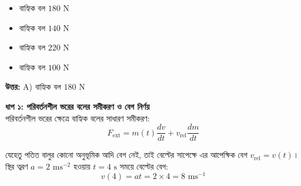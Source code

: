\documentclass[12pt, a4paper]{article}
\begin{document}
{{%
\vspace{1em}
\begin{center}
\end{center}
\vspace{1em}

\begin{itemize}[label={}, leftmargin=1cm, itemsep=0.5em]
    \item[\textbf{A)}] বাহ্যিক বল $180\text{ N}$
    \item[\textbf{B)}] বাহ্যিক বল $140\text{ N}$
    \item[\textbf{C)}] বাহ্যিক বল $220\text{ N}$
    \item[\textbf{D)}] বাহ্যিক বল $100\text{ N}$
\end{itemize}

\vspace{0.5em}
\begin{tcolorbox}[answerbox]
    \textbf{\color{success} উত্তর:} A) বাহ্যিক বল $180\text{ N}$
\end{tcolorbox}
\vspace{1em}

\begin{tcolorbox}[solutionbox={সমাধান (Solution)}]
    \noindent
    \textbf{ধাপ ১: পরিবর্তনশীল ভরের বলের সমীকরণ ও বেগ নির্ণয়} \\
    পরিবর্তনশীল ভরের ক্ষেত্রে বাহ্যিক বলের সাধারণ সমীকরণ:
    \[ F_{\text{ext}} = m(t) \frac{dv}{dt} + v_{\text{rel}} \frac{dm}{dt} \]
    
    যেহেতু পতিত বালুর কোনো অনুভূমিক আদি বেগ নেই, তাই বেল্টের সাপেক্ষে এর আপেক্ষিক বেগ $v_{\text{rel}} = v(t)$। স্থির ত্বরণ $a = 2\text{ ms}^{-2}$ হওয়ায় $t = 4\text{ s}$ সময়ে বেল্টের বেগ:
    \[ v(4) = a t = 2 \times 4 = 8\text{ ms}^{-1} \]
    

\end{tcolorbox}}}
\end{document}
